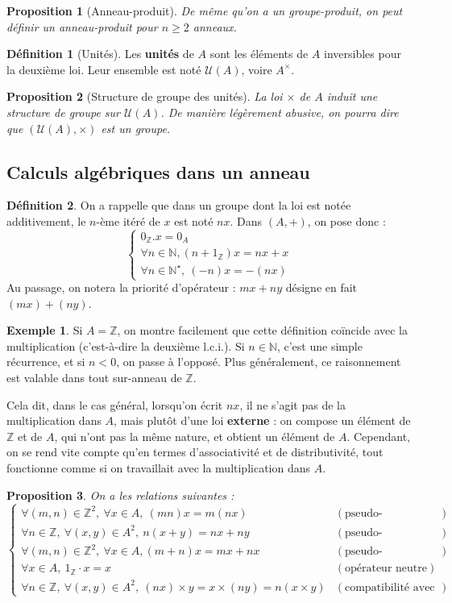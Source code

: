 \documentclass[french]{book}
\newcommand{\N}{\mathbb{N}}
\newcommand{\Z}{\mathbb{Z}}
\newcommand{\st}{^\star}
\theoremstyle{plain}
\newtheorem{prop}{Proposition}[chapter]
\theoremstyle{definition}
\newtheorem{dfn}{Définition}[chapter]
\newtheorem{exa}{Exemple}[chapter]
\theoremstyle{remark}
\begin{document}
\begin{prop}[Anneau-produit]
	De même qu'on a un groupe-produit, on peut définir un anneau-produit pour $n\geqslant2$ anneaux.
\end{prop}
\begin{dfn}[Unités]
	Les \textbf{unités} de $A$ sont les éléments de $A$ inversibles pour la deuxième loi. Leur ensemble est noté $\mathcal{U}(A)$, voire $A^\times$.
\end{dfn}
\begin{prop}[Structure de groupe des unités]
	La loi $\times$ de $A$ induit une structure de groupe sur $\mathcal{U}(A)$. De manière légèrement abusive, on pourra dire que $(\mathcal{U}(A),\times)$ est un groupe.
\end{prop}
\subsection{Calculs algébriques dans un anneau}
\begin{dfn}
	On a rappelle que dans un groupe dont la loi est notée additivement, le $n$-ème itéré de $x$ est noté $nx$. Dans $(A,+)$, on pose donc : $$\left \{ \begin{array}{lll}0_\Z.x=0_A \\ \forall n\in\N, (n+1_\Z)x=nx+x\\ \forall n\in\N\st,\ (-n)x=-(nx)\end{array}\right.$$ Au passage, on notera la priorité d'opérateur : $mx+ny$ désigne en fait $(mx)+(ny)$.
\end{dfn}
\begin{exa}
	Si $A=\Z$, on montre facilement que cette définition coïncide avec la multiplication (c'est-à-dire la deuxième l.c.i.). Si $n\in\N$, c'est une simple récurrence, et si $n<0$, on passe à l'opposé. Plus généralement, ce raisonnement est valable dans tout sur-anneau de $\Z$.
\end{exa}
Cela dit, dans le cas général, lorsqu'on écrit $nx$, il ne s'agit pas de la multiplication dans $A$, mais plutôt d'une loi \textbf{externe} : on compose un élément de $\Z$ et de $A$, qui n'ont pas la même nature, et obtient un élément de $A$. Cependant, on se rend vite compte qu'en termes d'associativité et de distributivité, tout fonctionne comme si on travaillait avec la multiplication dans $A$.
\begin{prop}
	On a les relations suivantes : 
	$$\left \{\begin{array}{lllll}\forall(m,n)\in\Z^2,\ \forall x\in A,\ (mn)x=m(nx)& (\text{pseudo-associativité}) \\ \forall n\in\Z,\ \forall(x,y)\in A^2,\ n(x+y)=nx+ny & (\text{pseudo-distributivité à gauche})\\ \forall(m,n)\in\Z^2,\ \forall x\in A, (m+n)x=mx+nx &(\text{pseudo-distributivité à droite})\\ \forall x\in A,\ 1_\Z\cdot x=x &(\text{opérateur neutre})\\ \forall n\in\Z,\ \forall(x,y)\in A^2,\ (nx)\times y=x\times(ny)=n(x\times y)&(\text{compatibilité avec le produit})\end{array}\right.$$
\end{prop}
\end{document}
